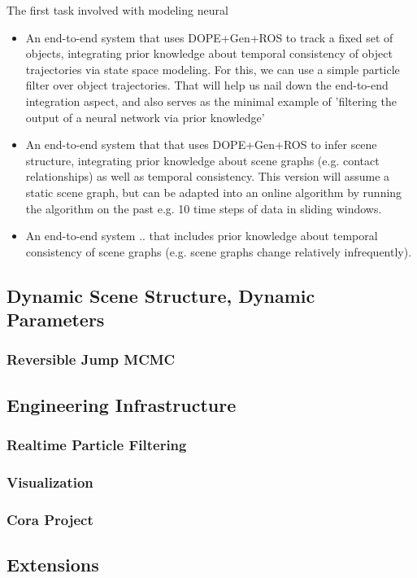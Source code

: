     The first task involved with modeling neural 
    \begin{itemize}
      \item An end-to-end system that uses DOPE+Gen+ROS to track a fixed set of
        objects, integrating prior knowledge about temporal consistency of
        object trajectories via state space modeling. For this, we can use a
        simple particle filter over object trajectories. That will help us nail
        down the end-to-end integration aspect, and also serves as the minimal
        example of 'filtering the output of a neural network via prior
        knowledge'
      \item An end-to-end system that that uses DOPE+Gen+ROS to infer scene
        structure, integrating prior knowledge about scene graphs (e.g. contact
        relationships) as well as temporal consistency. This version will
        assume a static scene graph, but can be adapted into an online
        algorithm by running the algorithm on the past e.g. 10 time steps of
        data in sliding windows.
      \item An end-to-end system .. that includes prior knowledge about
        temporal consistency of scene graphs (e.g. scene graphs change
        relatively infrequently).
    \end{itemize}

  \subsection{Dynamic Scene Structure, Dynamic Parameters}

    \todo

    \subsubsection{Reversible Jump MCMC}

      \todo


  \subsection{Engineering Infrastructure}

    \todo

    \subsubsection{Realtime Particle Filtering}

    \todo

    \subsubsection{Visualization}

    \todo

    \subsubsection{Cora Project}

    \todo


  \subsection{Extensions}

    \todo
